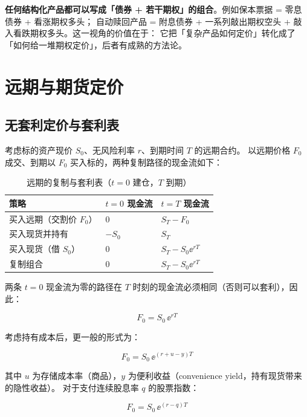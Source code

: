 \textbf{任何结构化产品都可以写成「债券 + 若干期权」的组合}。例如保本票据 = 零息债券 + 看涨期权多头；
自动赎回产品 = 附息债券 + 一系列敲出期权空头 + 敲入看跌期权多头。这一视角的价值在于：
它把「复杂产品如何定价」转化成了「如何给一堆期权定价」，后者有成熟的方法论。

\section{远期与期货定价}

\subsection{无套利定价与套利表}

考虑标的资产现价 $S_0$、无风险利率 $r$、到期时间 $T$ 的远期合约。
以远期价格 $F_0$ 成交、到期以 $F_0$ 买入标的，两种复制路径的现金流如下：

\begin{table}[htbp]
\centering
\caption{远期的复制与套利表（$t=0$ 建仓，$T$ 到期）}\label{tab:04-arb}
\tablefont
\begin{tabular}{@{}lll@{}}
\toprule
策略 & $t=0$ 现金流 & $t=T$ 现金流 \\
\midrule
买入远期（交割价 $F_0$） & $0$ & $S_T - F_0$ \\
买入现货并持有 & $-S_0$ & $S_T$ \\
买入现货（借 $S_0$） & $0$ & $S_T - S_0\ee^{rT}$ \\
\midrule
复制组合 & $0$ & $S_T - S_0\ee^{rT}$ \\
\bottomrule
\end{tabular}
\end{table}

两条 $t=0$ 现金流为零的路径在 $T$ 时刻的现金流必须相同（否则可以套利），因此：

\begin{equation}
  F_0 = S_0\,\ee^{rT}
  \label{eq:04-forward}
\end{equation}

考虑持有成本后，更一般的形式为：

\begin{equation}
  F_0 = S_0\,\ee^{(r+u-y)T}
  \label{eq:04-forward-cost}
\end{equation}

其中 $u$ 为存储成本率（商品），$y$ 为便利收益（convenience yield，持有现货带来的隐性收益）。
对于支付连续股息率 $q$ 的股票指数：

\begin{equation}
  F_0 = S_0\,\ee^{(r-q)T}
  \label{eq:04-forward-div}
\end{equation}

